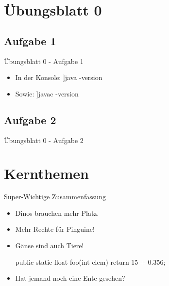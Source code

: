 \section{Übungsblatt 0}
\subsection{Aufgabe 1}
\begin{frame}[t]{Übungsblatt 0 - Aufgabe 1}
    \soldisablenumhl\def\smallerXLST{\lstfs[1.2]{8}}%
    \begin{itemize}[<+(1)->]
        \item In der Konsole: \rbash[:\smallerXLST\pause]{java -version}
        \item Sowie: \rbash[:\smallerXLST\pause]{javac -version}
    \end{itemize}
\end{frame}

\subsection{Aufgabe 2}
\begin{frame}[t]{Übungsblatt 0 - Aufgabe 2}
\end{frame}

\section{Kernthemen}
{\SummaryFrame
\begin{frame}[fragile]{Super-Wichtige Zusammenfassung}
    \begin{itemize}[<+(1)->]
        \itemsep12pt
        \item Dinos brauchen mehr Platz.
        \item Mehr Rechte für Pinguine!
        \item Gänse sind auch Tiere!
\begin{java}
public static float foo(int elem) {
    return 15 + 0.356;
}
\end{java}
        \item Hat jemand noch eine Ente gesehen?
    \end{itemize}
\end{frame}
}

